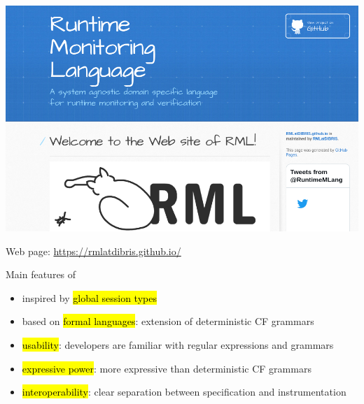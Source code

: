 \documentclass[10pt,usenames,dvipsnames]{beamer}
\begin{document}


\begin{frame}{\rml}
  \begin{center}
    \includegraphics[height=0.7\textheight]{images/rmlweb}
  \end{center}

  \rml Web page: \href{https://rmlatdibris.github.io/}{https://rmlatdibris.github.io/}
\end{frame}


\begin{frame}{\rml}

  \begin{block}{Main features of \rml}
    \begin{itemize}
    \item inspired by \hl{global session types}
    \item based on \hl{formal languages}: extension of deterministic CF grammars 
    \item \hl{usability}: developers are familiar with regular expressions and grammars
    \item \hl{expressive power}: more expressive than deterministic CF grammars
    \item \hl{interoperability}: clear separation between specification and instrumentation
    \end{itemize}
  \end{block}
\end{frame}

\end{document}
